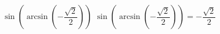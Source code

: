  {$\sin\left(\arcsin\left(-\dfrac{\sqrt{2}}{2}\right)\right)$}
{ $\sin\left(\arcsin\left(-\dfrac{\sqrt{2}}{2}\right)\right) = -\dfrac{\sqrt{2}}{2}$}
